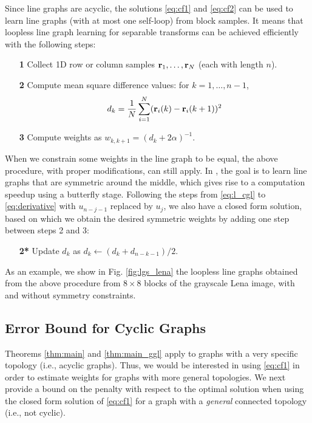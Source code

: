 \documentclass{article}
\begin{document}
Since line graphs are acyclic, the solutions \eqref{eq:cf1} and \eqref{eq:cf2} can be used to learn line graphs (with at most one self-loop) from block samples. It means that loopless line graph learning for separable transforms can be achieved efficiently with the following steps: 
\begin{itemize}[noitemsep,topsep=0pt,parsep=0pt,partopsep=0pt]
\item[{\bf 1}] Collect 1D row or column samples ${\bf r}_1,\dots,{\bf r}_N$ (each with length $n$). 
\item[{\bf 2}] Compute mean square difference values: for $k=1,\dots,n-1$,
\[
  d_k = \frac{1}{N}\sum_{i=1}^N({\bf r}_i(k)-{\bf r}_i(k+1))^2
\]
\item[{\bf 3}] Compute weights as $w_{k,k+1}=(d_k+2\alpha)^{-1}$.
\end{itemize}

When we constrain some weights in the line graph to be equal, the above procedure, with proper modifications, can still apply. In \cite{Lu2016}, the goal is to learn line graphs that are symmetric around the middle, which gives rise to a computation speedup using a butterfly stage. Following the steps from \eqref{eq:l_cgl} to \eqref{eq:derivative} with $u_{n-j-1}$ replaced by $u_j$, we also have a closed form solution, based on which we obtain the desired symmetric weights by adding one step between steps 2 and 3:
\begin{itemize}[noitemsep,topsep=0pt,parsep=0pt,partopsep=0pt]
\item[{\bf 2*}] Update $d_k$ as $d_k\leftarrow(d_k+d_{n-k-1})/2$.
\end{itemize}
As an example, we show in Fig. \ref{fig:lgs_lena} the loopless line graphs obtained from the above procedure from $8\times 8$ blocks of the grayscale Lena image, with and without symmetry constraints. 

\subsection{Error Bound for Cyclic Graphs}
\label{sec:erbd}
Theorems \ref{thm:main} and \ref{thm:main_ggl} apply to graphs with a very specific topology (i.e., acyclic graphs). Thus, we would be interested in using \eqref{eq:cf1} in order to estimate weights for graphs with more general topologies. We next provide %
a bound on the penalty with respect to the optimal solution when using the closed form solution of \eqref{eq:cf1} for a graph with a {\it general} connected topology (i.e., not cyclic). 
\end{document}
